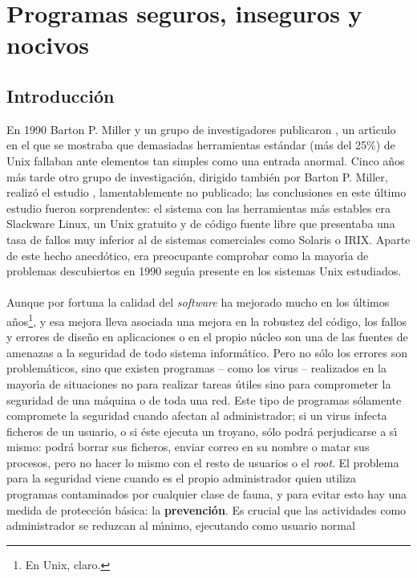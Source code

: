 \chapter{Programas seguros, inseguros y nocivos}
\section{Introducci\'on}
En 1990 Barton P. Miller y un grupo de investigadores publicaron 
\cite{kn:mil90}, un art\'{\i}culo
en el que se mostraba que demasiadas herramientas est\'andar (m\'as del 25\%) 
de Unix fallaban ante elementos tan simples como una entrada anormal. Cinco
a\~nos m\'as tarde otro grupo de investigaci\'on, dirigido tambi\'en por Barton 
P. Miller, realiz\'o el estudio \cite{kn:mil95}, lamentablemente no publicado; 
las conclusiones en este \'ultimo estudio fueron 
sorprendentes: el sistema con las herramientas m\'as estables era Slackware
Linux, un Unix gratuito y de c\'odigo fuente libre que presentaba una tasa de 
fallos muy inferior al de sistemas comerciales como Solaris o IRIX. Aparte de 
este hecho anecd\'otico, era preocupante comprobar como la mayor\'{\i}a de
problemas descubiertos en 1990 segu\'{\i}a presente en los sistemas Unix
estudiados.\\
\\Aunque por fortuna la calidad del {\it software} ha mejorado mucho en los
\'ultimos a\~nos\footnote{En Unix, claro.}, y esa mejora lleva asociada una 
mejora en la robustez del c\'odigo, los fallos y errores de dise\~no en 
aplicaciones o en el propio n\'ucleo son una de las fuentes de amenazas a la 
seguridad de todo sistema inform\'atico. Pero no
s\'olo los errores son problem\'aticos, sino que existen programas -- como los 
virus -- realizados en la mayor\'{\i}a de situaciones no para realizar tareas 
\'utiles sino para comprometer la seguridad de una m\'aquina o de toda una red.
Este tipo de programas s\'olamente compromete la seguridad cuando afectan al
administrador; si un virus infecta ficheros de un usuario, o si \'este ejecuta
un troyano, s\'olo podr\'a perjudicarse a s\'{\i} mismo: podr\'a borrar sus
ficheros, enviar correo en su nombre o matar sus procesos, pero no hacer lo
mismo con el resto de usuarios o el {\it root}. El problema para la seguridad
viene cuando es el propio administrador quien utiliza programas contaminados
por cualquier clase de fauna, y para evitar esto hay una medida de protecci\'on
b\'asica: la {\bf prevenci\'on}. Es crucial que las actividades como 
administrador se reduzcan al m\'{\i}nimo, ejecutando como usuario normal
